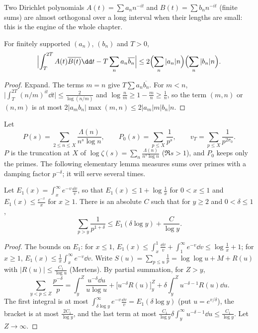 Two Dirichlet polynomials $A(t)=\sum a_nn^{-it}$ and $B(t)=\sum b_nn^{-it}$ (finite sums) are almost orthogonal over a long interval when their lengths are small: this is the engine of the whole chapter.

\begin{lemma}\label{lem:mvt2}
For finitely supported $(a_n)$, $(b_n)$ and $T>0$,
\[
\Bigl|\int_T^{2T}A(t)\overline{B(t)}\dd t-T\sum_na_n\overline{b_n}\Bigr|\le2\Bigl(\sum_n|a_n|n\Bigr)\Bigl(\sum_n|b_n|n\Bigr).
\]
\end{lemma}
\begin{proof}
Expand. The terms $m=n$ give $T\sum a_n\overline{b_n}$. For $m<n$, $\bigl|\int_T^{2T}(n/m)^{it}\dd t\bigr|\le\frac2{\log(n/m)}$ and $\log\frac nm\ge1-\frac mn\ge\frac1n$, so the term $(m,n)$ or $(n,m)$ is at most $2|a_mb_n|\max(m,n)\le2|a_m|m|b_n|n$.
\end{proof}

Let
\[
P(s)=\sum_{2\le n\le X}\frac{\Lambda(n)}{n^s\log n},\qquad P_0(s)=\sum_{p\le X}\frac1{p^s},\qquad v_T=\sum_{p\le X}\frac1{p^{2\sigma_0}}.
\]
$P$ is the truncation at $X$ of $\log\zeta(s)=\sum_n\frac{\Lambda(n)}{n^s\log n}$ ($\Re s>1$), and $P_0$ keeps only the primes. The following elementary lemma measures sums over primes with a damping factor $p^{-\delta}$; it will serve several times.

\begin{lemma}\label{lem:dampedmertens}
Let $E_1(x)=\int_x^\infty e^{-v}\frac{\dd v}v$, so that $E_1(x)\le1+\log\frac1x$ for $0<x\le1$ and $E_1(x)\le\frac{e^{-x}}x$ for $x\ge1$. There is an absolute $C$ such that for $y\ge2$ and $0<\delta\le1$,
\[
\sum_{p>y}\frac1{p^{1+\delta}}\le E_1(\delta\log y)+\frac C{\log y}.
\]
\end{lemma}
\begin{proof}
The bounds on $E_1$: for $x\le1$, $E_1(x)\le\int_x^1\frac{\dd v}v+\int_1^\infty e^{-v}\dd v\le\log\frac1x+1$; for $x\ge1$, $E_1(x)\le\frac1x\int_x^\infty e^{-v}\dd v$. Write $S(u)=\sum_{p\le u}\frac1p=\log\log u+M+R(u)$ with $|R(u)|\le\frac{C_1}{\log u}$ (Mertens). By partial summation, for $Z>y$,
\[
\sum_{y<p\le Z}\frac{p^{-\delta}}p=\int_y^Z\frac{u^{-\delta}\dd u}{u\log u}+\bigl[u^{-\delta}R(u)\bigr]_y^Z+\delta\int_y^Zu^{-\delta-1}R(u)\dd u.
\]
The first integral is at most $\int_{\delta\log y}^\infty e^{-v}\frac{\dd v}v=E_1(\delta\log y)$ (put $u=e^{v/\delta}$), the bracket is at most $\frac{2C_1}{\log y}$, and the last term at most $\frac{C_1}{\log y}\delta\int_y^\infty u^{-\delta-1}\dd u\le\frac{C_1}{\log y}$. Let $Z\to\infty$.
\end{proof}

